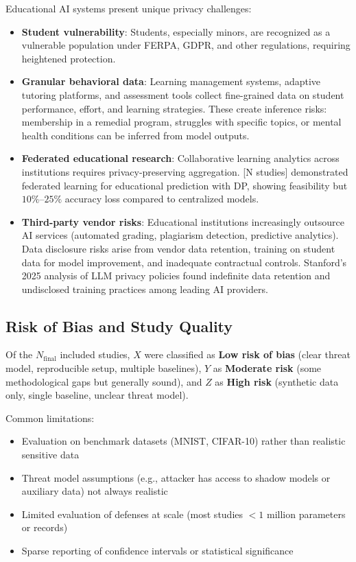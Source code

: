 \documentclass[11pt,a4paper]{article}
\begin{document}
Educational AI systems present unique privacy challenges:

\begin{itemize}
\item \textbf{Student vulnerability}: Students, especially minors, are recognized as a vulnerable population under FERPA, GDPR, and other regulations, requiring heightened protection.

\item \textbf{Granular behavioral data}: Learning management systems, adaptive tutoring platforms, and assessment tools collect fine-grained data on student performance, effort, and learning strategies. These create inference risks: membership in a remedial program, struggles with specific topics, or mental health conditions can be inferred from model outputs.

\item \textbf{Federated educational research}: Collaborative learning analytics across institutions requires privacy-preserving aggregation. [N studies] demonstrated federated learning for educational prediction with DP, showing feasibility but $10\%$–$25\%$ accuracy loss compared to centralized models.

\item \textbf{Third-party vendor risks}: Educational institutions increasingly outsource AI services (automated grading, plagiarism detection, predictive analytics). Data disclosure risks arise from vendor data retention, training on student data for model improvement, and inadequate contractual controls. Stanford's 2025 analysis of LLM privacy policies found indefinite data retention and undisclosed training practices among leading AI providers.
\end{itemize}

\subsection{Risk of Bias and Study Quality}

Of the $N_{\text{final}}$ included studies, $X$ were classified as \textbf{Low risk of bias} (clear threat model, reproducible setup, multiple baselines), $Y$ as \textbf{Moderate risk} (some methodological gaps but generally sound), and $Z$ as \textbf{High risk} (synthetic data only, single baseline, unclear threat model).

Common limitations:
\begin{itemize}
\item Evaluation on benchmark datasets (MNIST, CIFAR-10) rather than realistic sensitive data
\item Threat model assumptions (e.g., attacker has access to shadow models or auxiliary data) not always realistic
\item Limited evaluation of defenses at scale (most studies $<1$ million parameters or records)
\item Sparse reporting of confidence intervals or statistical significance
\end{itemize}
\end{document}
